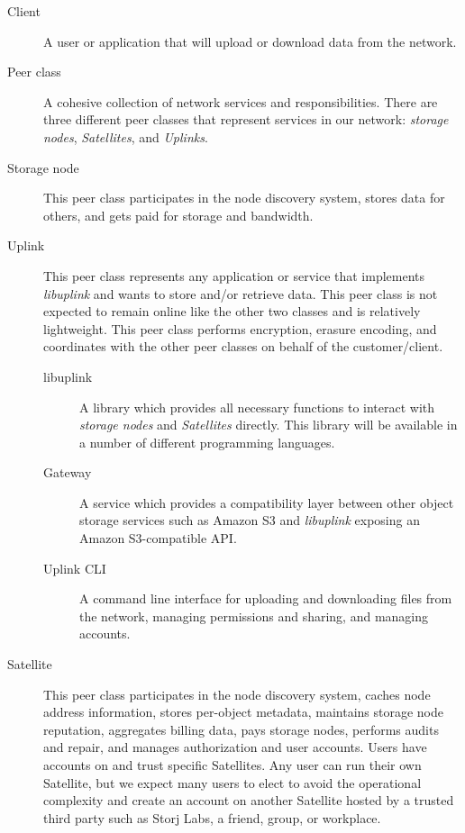 \documentclass[8pt,fleqn,openany]{book}
\begin{document}
\begin{description}
\item[Client] A user or application that will upload or download data from the network.

\item[Peer class] A cohesive collection of network services and
  responsibilities. There are three different peer classes that represent
  services in our network: {\em storage nodes}, {\em Satellites}, and {\em Uplinks}.

\item[Storage node] This peer class participates in the node discovery
  system, stores data for others, and gets paid for storage and bandwidth.

\item[Uplink] This peer class represents any application or
  service that implements {\em libuplink} and wants to store and/or retrieve data. This peer class
  is not expected to remain online like the other two classes and is
  relatively lightweight. This peer class performs encryption, erasure encoding,
  and coordinates with the other peer classes on behalf of the customer/client.

  \begin{description}
  \item[libuplink] A library which provides all necessary functions to interact
    with {\em storage nodes} and {\em Satellites} directly. This library will
    be available in a number of different programming languages.

  \item[Gateway] A service which provides a compatibility layer between other
    object storage services such as Amazon S3 and {\em libuplink} exposing an
    Amazon S3-compatible API.

  \item[Uplink CLI] A command line interface for uploading and downloading
    files from the network, managing permissions and sharing, and managing
    accounts.
  \end{description}

\item[Satellite] This peer class participates in the node discovery system,
  caches node address information, stores per-object metadata, maintains storage
  node reputation, aggregates billing data, pays storage nodes, performs audits and repair, and manages
  authorization and user accounts.
  Users have accounts on and trust specific Satellites.
  Any user can run their own Satellite, but we expect many users
  to elect to avoid the operational complexity and create an account on
  another Satellite hosted by a trusted third party such as Storj Labs,
  a friend, group, or workplace.

\end{description}
\end{document}
